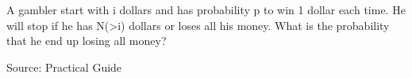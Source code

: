 \begin{exe}
A gambler start with i dollars and has probability p to win 1 dollar each time. He will stop if he has N(>i) dollars or loses all his money. What is the probability that he end up losing all money?
\end{exe}
Source: Practical Guide
\begin{teacher}
\begin{sol}
\end{sol}
\end{teacher}
